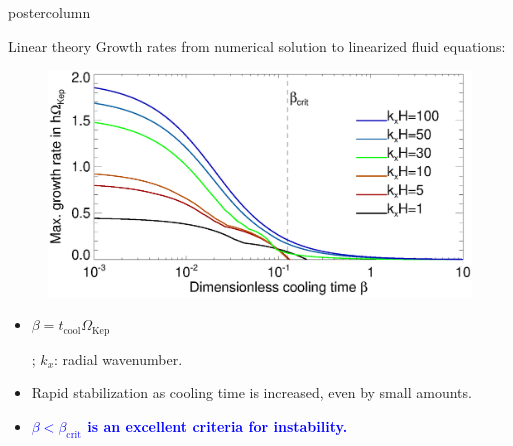 \documentclass[final,hyperref={pdfpagelabels=false}]{beamer}
\begin{document}
\begin{frame}
\begin{columns}
\begin{column}{.49\textwidth}
\begin{beamercolorbox}[center,wd=\textwidth]{postercolumn}
\begin{minipage}[T]{.95\textwidth}
{            
            \begin{block}{\Large Linear theory}
              \justifying
              Growth rates from numerical solution to linearized fluid
              equations:\\
              \vspace{-1.41cm}
              \begin{figure}
                 \includegraphics[width=\linewidth]{figures/gcorr_compare_iso_maxrate_z5.ps}%
               \end{figure}
               \vspace{-1.cm}
               \begin{itemize}
               \item \begin{onlinebox}{8cm}$\beta =
                   t_\mathrm{cool}\Omega_\mathrm{Kep}$\end{onlinebox};
                 $k_x$: radial wavenumber. 
               \item Rapid stabilization as cooling time is increased,
                 even by small amounts.
               \item \begin{onlinebox}{27cm} \textcolor{blue}{\bf{$\beta<\beta_\mathrm{crit}$ 
                       is an excellent criteria for instability.}}\end{onlinebox}
               \end{itemize}
               \vspace{-0.65cm}
             \end{block}
             
}
\end{minipage}
\end{beamercolorbox}
\end{column}
\end{columns}
\end{frame}
\end{document}

